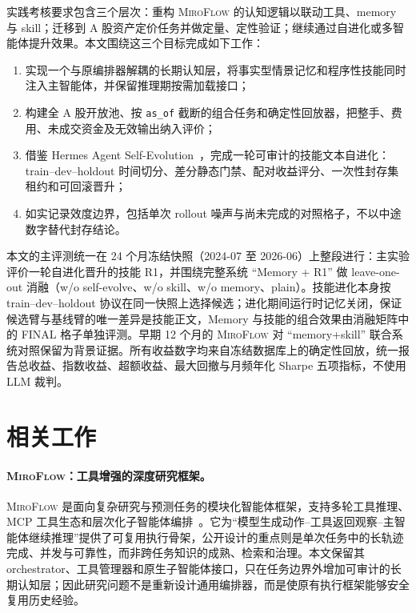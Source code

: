 \documentclass[11pt]{article}
\newcommand{\miroflow}{\textsc{MiroFlow}}
\begin{document}
实践考核要求包含三个层次：重构 \miroflow{} 的认知逻辑以联动工具、memory 与 skill；迁移到 A 股资产定价任务并做定量、定性验证；继续通过自进化或多智能体提升效果。本文围绕这三个目标完成如下工作：
\begin{enumerate}
    \item 实现一个与原编排器解耦的长期认知层，将事实型情景记忆和程序性技能同时注入主智能体，并保留推理期按需加载接口；
    \item 构建全 A 股开放池、按 \texttt{as\_of} 截断的组合任务和确定性回放器，把整手、费用、未成交资金及无效输出纳入评价；
    \item 借鉴 Hermes Agent Self-Evolution~\citep{hermes2025}，完成一轮可审计的技能文本自进化：train--dev--holdout 时间切分、差分静态门禁、配对收益评分、一次性封存集租约和可回滚晋升；
    \item 如实记录效度边界，包括单次 rollout 噪声与尚未完成的对照格子，不以中途数字替代封存结论。
\end{enumerate}

本文的主评测统一在 24 个月冻结快照（2024-07 至 2026-06）上整段进行：主实验评价一轮自进化晋升的技能 R1，并围绕完整系统 ``Memory + R1'' 做 leave-one-out 消融（w/o self-evolve、w/o skill、w/o memory、plain）。技能进化本身按 train--dev--holdout 协议在同一快照上选择候选；进化期间运行时记忆关闭，保证候选臂与基线臂的唯一差异是技能正文，Memory 与技能的组合效果由消融矩阵中的 FINAL 格子单独评测。早期 12 个月的 \miroflow{} 对 ``memory+skill'' 联合系统对照保留为背景证据。所有收益数字均来自冻结数据库上的确定性回放，统一报告总收益、指数收益、超额收益、最大回撤与月频年化 Sharpe 五项指标，不使用 LLM 裁判。

\section{相关工作}
\label{sec:related}

\paragraph{\miroflow{}：工具增强的深度研究框架。}
\miroflow{} 是面向复杂研究与预测任务的模块化智能体框架，支持多轮工具推理、MCP 工具生态和层次化子智能体编排~\citep{miroflow2025}。它为``模型生成动作--工具返回观察--主智能体继续推理''提供了可复用执行骨架，公开设计的重点则是单次任务中的长轨迹完成、并发与可靠性，而非跨任务知识的成熟、检索和治理。本文保留其 orchestrator、工具管理器和原生子智能体接口，只在任务边界外增加可审计的长期认知层；因此研究问题不是重新设计通用编排器，而是使原有执行框架能够安全复用历史经验。
\end{document}

